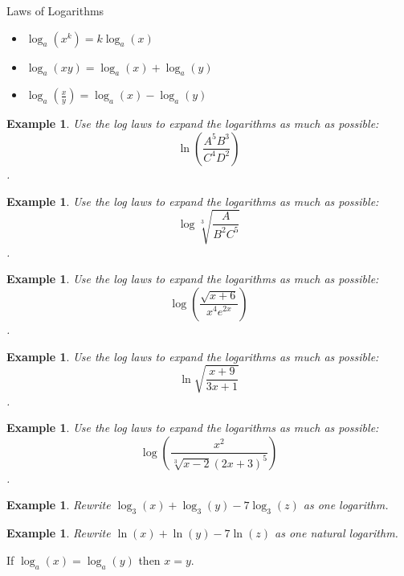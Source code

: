 \documentclass[twoside]{tufte-handout}
\newcounter{ekcounter}%
\theoremstyle{ekimcustom}
\newtheorem{exm}[ekcounter]{Example}
\begin{document}
\begin{bformula}{Laws of Logarithms}{}
\begin{itemize}
	\item   $\log_a(x^k)=k\log_a(x)$ 
		\item  $\log_a(xy)=\log_a(x)+\log_a(y)$
			\item $\log_a\left(\frac{x}{y}\right)=\log_a(x)-\log_a(y)$   
\end{itemize}	
\end{bformula}

\everymath{\displaystyle}
\begin{exm}{Use the log laws to expand the logarithms as much as possible: $$\ln\left(\frac{A^5B^3}{C^4D^2}\right)$$.}
\end{exm}\vskip10pt

\begin{exm}{Use the log laws to expand the logarithms as much as possible: $$\log\sqrt[3]{\frac{A}{B^2C^5}}$$.}
\end{exm}\vskip10pt

\everymath{\displaystyle}
\begin{exm}{Use the log laws to expand the logarithms as much as possible: $$\log\left(\frac{\sqrt{x+6}}{x^4e^{2x}}\right)$$.}
\end{exm}\vskip10pt

\begin{exm}{Use the log laws to expand the logarithms as much as possible: $$\ln\sqrt{\frac{x+9}{3x+1}}$$.}
\end{exm}\vskip10pt

\everymath{\displaystyle}
\begin{exm}{Use the log laws to expand the logarithms as much as possible: $$\log\left( \frac{x^2}{\sqrt[3]{x-2}(2x+3)^5} \right)$$.}
\end{exm}\vskip10pt

\begin{exm}{Rewrite $\log_3(x) + \log_3(y) - 7\log_3(z)$ as one logarithm.}
\end{exm}\vskip10pt

\everymath{\displaystyle}
\begin{exm}{Rewrite $\ln(x) + \ln(y) - 7\ln(z)$ as one \emph{natural} logarithm.}
\end{exm}\vskip10pt


\begin{bmethod}{}{}
If $\log_a(x)=\log_a(y)$ then $x=y$. 
\end{bmethod}
\end{document}
